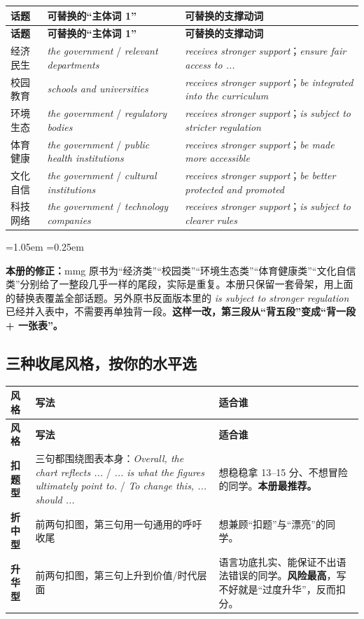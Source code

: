 \documentclass[11pt,a4paper]{ctexart}
\newcommand{\en}[1]{\textit{#1}}
\newenvironment{note}{%
  \par\addvspace{5pt}%
  \begin{list}{}{\leftmargin=1.05em \rightmargin=0.25em \listparindent=0pt
    \itemindent=0pt \topsep=0pt \parsep=2pt \itemsep=2pt \partopsep=0pt}%
  \item\relax\small\color{ink}%
}{%
  \end{list}\addvspace{5pt}%
}
\begin{document}
\begin{longtable}{L{3.4cm} L{5.4cm} L{5.4cm}}
\toprule
\textbf{话题} & \textbf{可替换的“主体词 1”} & \textbf{可替换的支撑动词}\\
\midrule
\endfirsthead
\toprule
\textbf{话题} & \textbf{可替换的“主体词 1”} & \textbf{可替换的支撑动词}\\
\midrule
\endhead
经济民生 & \en{the government} / \en{relevant departments} & \en{receives stronger support}；\en{ensure fair access to ...}\\
\midrule
校园教育 & \en{schools and universities} & \en{receives stronger support}；\en{be integrated into the curriculum}\\
\midrule
环境生态 & \en{the government} / \en{regulatory bodies} & \en{receives stronger support}；\en{is subject to stricter regulation}\\
\midrule
体育健康 & \en{the government} / \en{public health institutions} & \en{receives stronger support}；\en{be made more accessible}\\
\midrule
文化自信 & \en{the government} / \en{cultural institutions} & \en{receives stronger support}；\en{be better protected and promoted}\\
\midrule
科技网络 & \en{the government} / \en{technology companies} & \en{receives stronger support}；\en{is subject to clearer rules}\\
\bottomrule
\end{longtable}

\begin{note}
\textbf{本册的修正：}mmg 原书为“经济类”“校园类”“环境生态类”“体育健康类”“文化自信类”分别给了一整段几乎一样的尾段，实际是重复。本册只保留一套骨架，用上面的替换表覆盖全部话题。另外原书反面版本里的 \en{is subject to stronger regulation} 已经并入表中，不需要再单独背一段。\textbf{这样一改，第三段从“背五段”变成“背一段 + 一张表”。}
\end{note}

\subsection{三种收尾风格，按你的水平选}

\begin{longtable}{C{2.6cm} L{5.6cm} L{5.9cm}}
\toprule
\textbf{风格} & \textbf{写法} & \textbf{适合谁}\\
\midrule
\endfirsthead
\toprule
\textbf{风格} & \textbf{写法} & \textbf{适合谁}\\
\midrule
\endhead
\textbf{扣题型} & 三句都围绕图表本身：\en{Overall, the chart reflects ...} / \en{... is what the figures ultimately point to.} / \en{To change this, ... should ...} & 想稳稳拿 13--15 分、不想冒险的同学。\textbf{本册最推荐。}\\
\midrule
\textbf{折中型} & 前两句扣图，第三句用一句通用的呼吁收尾 & 想兼顾“扣题”与“漂亮”的同学。\\
\midrule
\textbf{升华型} & 前两句扣图，第三句上升到价值/时代层面 & 语言功底扎实、能保证不出语法错误的同学。\textbf{风险最高}，写不好就是“过度升华”，反而扣分。\\
\bottomrule
\end{longtable}
\end{document}
